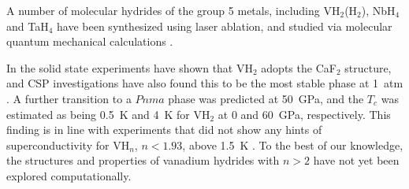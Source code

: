 \documentclass[12pt,letterpaper,oneside]{article}
\begin{document}
A number of molecular hydrides of the group 5 metals, including VH$_2$(H$_2$), NbH$_4$ and TaH$_4$ have been synthesized using laser ablation, and studied via molecular quantum mechanical calculations \cite{Wang:2011}. 

In the solid state experiments have shown that VH$_2$ adopts the CaF$_2$ structure, and CSP investigations have also found this to be the most stable phase at 1~atm \cite{Chen:2014}. A further transition to a $Pnma$ phase was predicted at 50~GPa, and the $T_c$ was estimated as being 0.5~K and 4~K for VH$_2$ at 0 and 60~GPa, respectively. This finding is in line with experiments that did not show any hints of superconductivity for VH$_n$, $n<1.93$, above 1.5~K \cite{Ohlendorf:1979a}.  To the best of our knowledge, the structures and properties of vanadium hydrides with $n>2$ have not yet been explored computationally. 
\end{document}
